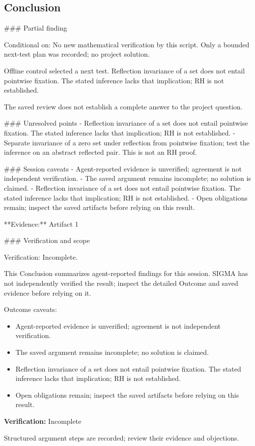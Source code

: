 \documentclass[11pt]{article}
\begin{document}
\subsection{Conclusion}
\#\#\# Partial finding

Conditional on: No new mathematical verification by this script. Only a bounded next-test plan was recorded; no project solution.

Offline control selected a next test. Reflection invariance of a set does not entail pointwise fixation. The stated inference lacks that implication; RH is not established.

The saved review does not establish a complete answer to the project question.

\#\#\# Unresolved points
- Reflection invariance of a set does not entail pointwise fixation. The stated inference lacks that implication; RH is not established.
- Separate invariance of a zero set under reflection from pointwise fixation; test the inference on an abstract reflected pair. This is not an RH proof.

\#\#\# Session caveats
- Agent-reported evidence is unverified; agreement is not independent verification.
- The saved argument remains incomplete; no solution is claimed.
- Reflection invariance of a set does not entail pointwise fixation. The stated inference lacks that implication; RH is not established.
- Open obligations remain; inspect the saved artifacts before relying on this result.

**Evidence:** Artifact 1

\#\#\# Verification and scope

Verification: Incomplete.

This Conclusion summarizes agent-reported findings for this session. SIGMA has not independently verified the result; inspect the detailed Outcome and saved evidence before relying on it.\par
Outcome caveats:\par
\begin{itemize}
\item Agent-reported evidence is unverified; agreement is not independent verification.
\item The saved argument remains incomplete; no solution is claimed.
\item Reflection invariance of a set does not entail pointwise fixation. The stated inference lacks that implication; RH is not established.
\item Open obligations remain; inspect the saved artifacts before relying on this result.
\end{itemize}
\textbf{Verification:} Incomplete\par
Structured argument steps are recorded; review their evidence and objections.\par
\end{document}
